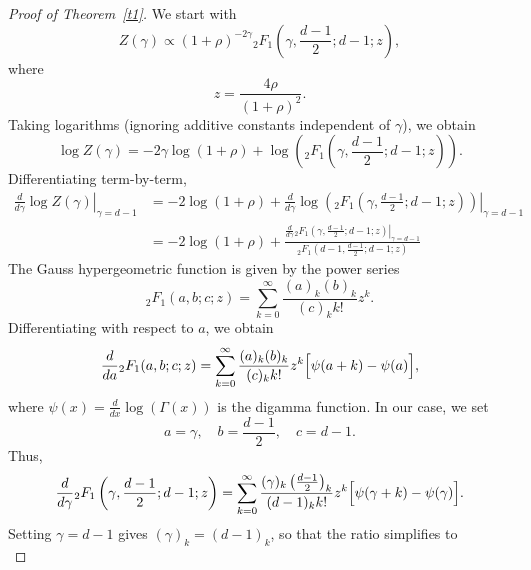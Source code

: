 \documentclass{article}
\begin{document}
\begin{proof}[Proof of Theorem~\ref{t1}]
We start with
\begin{equation*}
    Z(\gamma) \propto \left(1+\rho\right)^{-2\gamma}  {}_2F_1\left(\gamma, \frac{d-1}{2}; d-1; z \right),
\end{equation*}
where
\begin{equation*}
    z = \frac{4\rho}{(1+\rho)^2}.
\end{equation*}
Taking logarithms (ignoring additive constants independent of $\gamma$), we obtain
\begin{equation*}
    \log Z(\gamma) = -2\gamma \log(1+\rho) + \log \left( {}_2F_1\left(\gamma, \frac{d-1}{2}; d-1; z \right) \right).
\end{equation*}
Differentiating term-by-term,
\begin{align*}
    \left.\frac{d}{d\gamma} \log Z(\gamma) \right|_{\gamma=d-1} &= -2\log(1+\rho) + \left.\frac{d}{d\gamma} \log \left( {}_2F_1\left(\gamma, \frac{d-1}{2}; d-1; z \right) \right)  \right|_{\gamma=d-1} \\
    &= -2\log(1+\rho) + \frac{\left. \frac{d}{d\gamma}  {}_2F_1\left(\gamma, \frac{d-1}{2}; d-1; z \right) \right|_{\gamma=d-1}}{{}_2F_1\left(d-1, \frac{d-1}{2}; d-1; z \right)}
\end{align*}
The Gauss hypergeometric function is given by the power series \cite[15.2.1]{watson:DLMF}
\begin{equation*}
    {}_2F_1(a,b;c;z) = \sum_{k=0}^{\infty} \frac{(a)_k (b)_k}{(c)_k  k!}  z^k.
\end{equation*}
Differentiating with respect to $a$, we obtain
\begin{equation*}
    \frac{d}{da} {}_2F_1(a,b;c;z) = \sum_{k=0}^{\infty} \frac{(a)_k (b)_k}{(c)_k  k!}  z^k \Bigl[ \psi(a+k) - \psi(a) \Bigr],
\end{equation*}
where $\psi(x) = \frac{d}{dx} \log\left( \Gamma(x)\right)$ is the digamma function. In our case, we set
\begin{equation*}
    a = \gamma, \quad b = \frac{d-1}{2}, \quad c = d-1.
\end{equation*}
Thus,
\begin{equation*}
    \frac{d}{d\gamma} {}_2F_1\left(\gamma, \frac{d-1}{2}; d-1; z \right) = \sum_{k=0}^{\infty} \frac{(\gamma)_k \left(\frac{d-1}{2}\right)_k}{(d-1)_k  k!}  z^k \Bigl[ \psi(\gamma+k) - \psi(\gamma) \Bigr].
\end{equation*}
Setting $\gamma = d-1$ gives $ (\gamma)_k = (d-1)_k $, so that the ratio simplifies to
\begin{equation*}

\end{equation*}
\end{proof}
\end{document}
